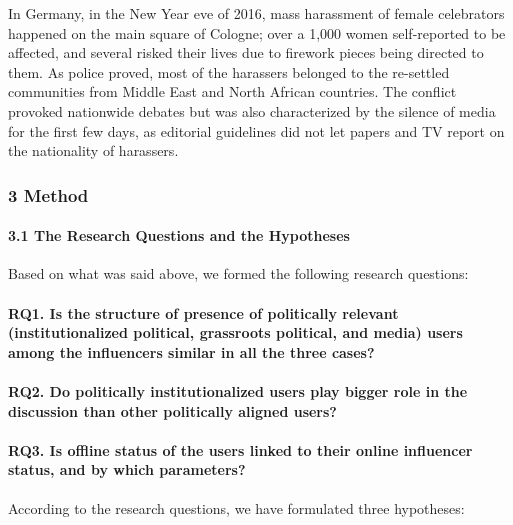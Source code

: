 In Germany, in the New Year eve of 2016, mass harassment of female celebrators happened on the main square of Cologne; over a 1,000 women self-reported to be affected, and several risked their lives due to firework pieces being directed to them. As police proved, most of the harassers belonged to the re-settled communities from Middle East and North African countries. The conflict provoked nationwide debates but was also characterized by the silence of media for the first few days, as editorial guidelines did not let papers and TV report on the nationality of harassers.

\subsubsection{3 Method}

\paragraph{3.1 The Research Questions and the Hypotheses} Based on what was said above, we formed the following research questions:

\paragraph{RQ1. Is the structure of presence of politically relevant (institutionalized political, grassroots political, and media) users among the influencers similar in all the three cases?}
\paragraph{RQ2. Do politically institutionalized users play bigger role in the discussion than other politically aligned users?}
\paragraph{RQ3. Is offline status of the users linked to their online influencer status, and by which parameters?}

According to the research questions, we have formulated three hypotheses:

